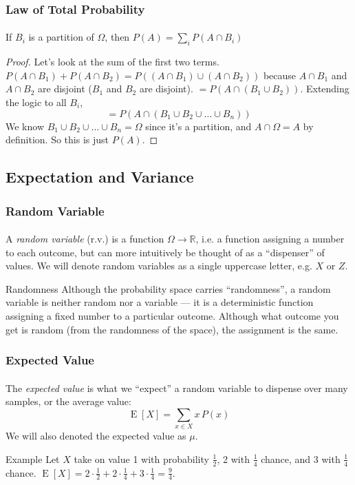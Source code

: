 \documentclass{beamer}                             %
\DeclareMathOperator{\E}{E}
\begin{document}
\begin{frame}
\frametitle{Law of Total Probability}
\framesubtitle{}
\begin{theorem}
  If \( B_i \) is a partition of \( \Omega \), then
  \( P(A) = \sum_i P(A \cap B_i) \)
\end{theorem}
\begin{proof}
  Let's look at the sum of the first two terms. 
  \( P(A \cap B_1) + P(A \cap B_2) = P((A \cap B_1) \cup (A \cap B_2)) \) 
  because \( A \cap B_1 \) and \( A \cap B_2 \) are
  disjoint (\( B_1 \) and \( B_2 \) are disjoint).
  \( = P(A \cap (B_1 \cup B_2)) \).
  Extending the logic to all \( B_i \),
  \[ = P(A \cap (B_1 \cup B_2 \cup \dots \cup B_n)) \]
  We know \( B_1 \cup B_2 \cup \dots \cup B_n = \Omega \) since
  it's a partition, and \( A \cap \Omega = A \) by definition.
  So this is just \( P(A) \).
\end{proof}
\end{frame}

\subsection{Expectation and Variance}

\begin{frame}
\frametitle{Random Variable}
\framesubtitle{}
\begin{definition} 
  A \textit{random variable} (r.v.) is a function \( \Omega \to \mathbb{R} \),
  i.e. a function assigning a number to each outcome, but can more intuitively
  be thought of as a \enquote{dispenser} of values. We will denote random
  variables as a single uppercase letter, e.g. \( X \) or \( Z \).
\end{definition}
\begin{alertblock}{Randomness}
  Although the probability space carries \enquote{randomness}, a random
  variable is neither random nor a variable --- it is a deterministic function
  assigning a fixed number to a particular outcome. Although what outcome you
  get is random (from the randomness of the space), the assignment is the same.
\end{alertblock}
\end{frame}

\begin{frame}
\frametitle{Expected Value}
\framesubtitle{}
\begin{definition}
  The \textit{expected value} is what we \enquote{expect} a random variable to
  dispense over many samples, or the average value: 
  \[ \E[X] = \sum_{x \in X} x \, P(x) \] 
  We will also denoted the expected value as \( \mu \).
\end{definition}
\begin{exampleblock}{Example}
  Let \( X \) take on value 1 with probability \( \frac{1}{2} \), 2 with
  \( \frac{1}{4} \) chance, and 3 with \( \frac{1}{4} \) chance.
  \( \E[X] = 2 \cdot \frac{1}{2} + 2 \cdot \frac{1}{4} + 3 \cdot \frac{1}{4} 
           = \frac{9}{4} \).
\end{exampleblock}
\end{frame}
\end{document}

